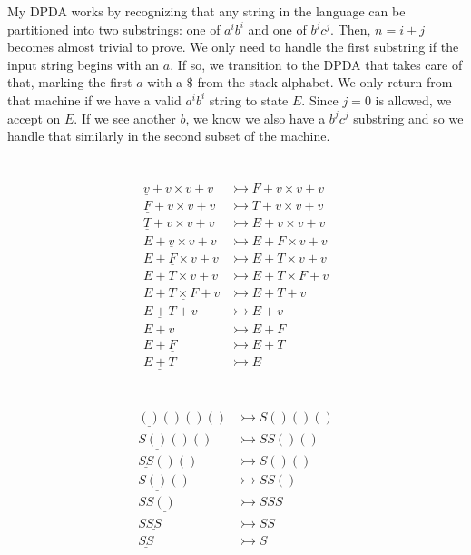 \documentclass{article}
\begin{document}
\noindent
My DPDA works by recognizing that any string in the language can be partitioned into two substrings: one of $a^ib^i$ and one of $b^jc^j$. Then, $n = i + j$ becomes almost trivial to prove. We only need to handle the first substring if the input string begins with an $a$. If so, we transition to the DPDA that takes care of that, marking the first $a$ with a $\$$ from the stack alphabet. We only return from that machine if we have a valid $a^ib^i$ string to state $E$. Since $j = 0$ is allowed, we accept on $E$. If we see another $b$, we know we also have a $b^jc^j$ substring and so we handle that similarly in the second subset of the machine.

\newpage
\section{}

\begin{align*}
\underline{v} + v \times v + v &\rightarrowtail F + v \times v + v \\
\underline{F} + v \times v + v &\rightarrowtail T + v \times v + v \\
\underline{T} + v \times v + v &\rightarrowtail E + v \times v + v \\
E + \underline{v} \times v + v &\rightarrowtail E + F \times v + v \\
E + \underline{F} \times v + v &\rightarrowtail E + T \times v + v \\
E + T \times \underline{v} + v &\rightarrowtail E + T \times F + v \\
E + \underline{T \times F} + v &\rightarrowtail E + T + v \\
\underline{E + T} + v &\rightarrowtail E + v \\
E + v &\rightarrowtail E + F \\
E + \underline{F} &\rightarrowtail E + T \\
\underline{E + T} &\rightarrowtail E
\end{align*}

\newpage
\section{}
\subsection{}
\begin{align*}
\underline{()}()()() &\rightarrowtail S()()() \\
S\underline{()}()() &\rightarrowtail SS()() \\
\underline{SS}()() &\rightarrowtail S()() \\
S\underline{()}() &\rightarrowtail SS() \\
SS\underline{()} &\rightarrowtail SSS \\
S\underline{SS} &\rightarrowtail SS \\
\underline{SS} &\rightarrowtail S
\end{align*}
\end{document}
